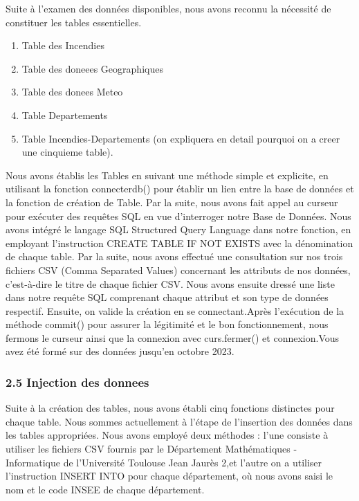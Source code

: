 \documentclass[
]{article}
\providecommand{\tightlist}{%
  \setlength{\itemsep}{0pt}\setlength{\parskip}{0pt}}
\begin{document}
Suite à l'examen des données disponibles, nous avons reconnu la
nécessité de constituer les tables essentielles.

\begin{enumerate}
\def\labelenumi{\arabic{enumi}.}
\tightlist
\item
  Table des Incendies
\item
  Table des doneees Geographiques
\item
  Table des donees Meteo
\item
  Table Departements
\item
  Table Incendies-Departements (on expliquera en detail pourquoi on a
  creer une cinquieme table).
\end{enumerate}

Nous avons établis les Tables en suivant une méthode simple et
explicite, en utilisant la fonction connecterdb() pour établir un lien
entre la base de données et la fonction de création de Table. Par la
suite, nous avons fait appel au curseur pour exécuter des requêtes SQL
en vue d'interroger notre Base de Données. Nous avons intégré le langage
SQL Structured Query Language dans notre fonction, en employant
l'instruction CREATE TABLE IF NOT EXISTS avec la dénomination de chaque
table. Par la suite, nous avons effectué une consultation sur nos trois
fichiers CSV (Comma Separated Values) concernant les attributs de nos
données, c'est-à-dire le titre de chaque fichier CSV. Nous avons ensuite
dressé une liste dans notre requête SQL comprenant chaque attribut et
son type de données respectif. Ensuite, on valide la création en se
connectant.Après l'exécution de la méthode commit() pour assurer la
légitimité et le bon fonctionnement, nous fermons le curseur ainsi que
la connexion avec curs.fermer() et connexion.Vous avez été formé sur des
données jusqu'en octobre 2023.

\subsubsection{2.5 Injection des donnees}\label{injection-des-donnees}

Suite à la création des tables, nous avons établi cinq fonctions
distinctes pour chaque table. Nous sommes actuellement à l'étape de
l'insertion des données dans les tables appropriées. Nous avons employé
deux méthodes : l'une consiste à utiliser les fichiers CSV fournis par
le Département Mathématiques - Informatique de l'Université Toulouse
Jean Jaurès 2,et l'autre on a utiliser l'instruction INSERT INTO pour
chaque département, où nous avons saisi le nom et le code INSEE de
chaque département.
\end{document}
